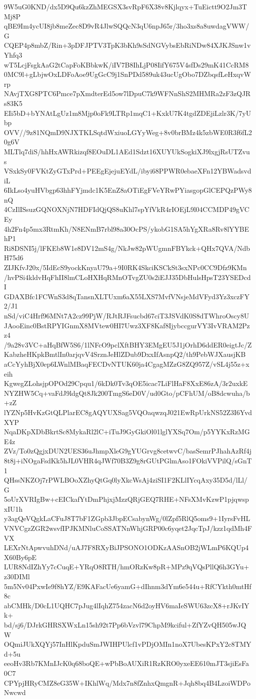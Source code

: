 9W5uG0KND/dx5D9Qu6kzZhMEGSX3svRpF6X38v8Kjlqyx+TuEictt9O2Jm3TMj8P
qBE9Im4ycUI8jb8meZec8D9vR4JlwSQQcN3qU6npJ65r/3ho3xs8a8uwdagVWW/G
CQEP4p8mbZ/Rin+3pDFJPTV3TpK3bKh9sSdNGVybsEbRiNDw84XJKJSnw1vYhfq3
wT5LcjFsgkAaG2tCapFoKBbkwK/iIV7B8IhLjP08IifY675V4sfDs29mK41CcRM8
0MC9l+gLbjwOxLDFoAoe9UgGcC9j1SnPDd589uk43ucUgObo7DZbqsfLeHxqvWrp
NAvjTXG8PTC6Pmce7pXmdterEd5ow7lDpuC7k9WFNnShS2MHMRa2zF3zQJRs83K5
EIi5bD+bYNAtLgUz1m8Mjp0oFk9LTRp1mqC1+KxkU7K4tgdZDEjiLzlr3K/7yUbp
OVV//9z81NQmD9NJXTKLSqtdWxiuoLGYyWeg+8v0brBMz4k5zbWE0R3f6fL20g6V
MLTlq7diS/hhHxAWRkizqf8EOuDL1AEd1Sdzt16XUYUkSogkiXJ9lxgjRsUTZvus
VSxkSy0FVKtZyGTxPrd+PEEgEjejuEYdL/ibyi68PPWR0ebaeXFn12YBWadsvdiL
6IkLso4yuHVbgp63hhFYjmdc1K5EnZ8aOTiEgFVeYRwPYiasgopGlCEPQzPWy8nQ
4CzIlISsuzGQNOXNjN7HDFIdQjQS8uKhl7spYfVkR4rIOEjL9l04CCMDP49gVCEy
4h2Fn4p5mx3RtmKh/N8ENmB7rbl98a30OcPS/ykobG1SA5hYgXRa8Rv8lYYBEhP1
Ri8DSNI5j/lFKEb8W1e8DV12mS4g/NkJw82pWUgmnFBYkck+QHx7QVA/NdbH75d6
ZIJKfvJ20x/5IdEcS9yockKnyaU79a+9I0RK4SkciKSCkSt3sxNPc0CC9Dfz9KMn
/hvPSi4kldvHqFhII8lmCLoHXHqRMnOTvgZU0s2iEJJ35DbHulsHpsT23YSEDcdI
GDAXBfc1FCWnS3d8qTansnXLTUxm6aX55LXS7MvfVNsjeMdVFyd3Yz3xczFY2/J1
nSd/viC4Hrf96MNt7A2cz99PjW/RJtRJFsucbd67ciT3JSVdK0S8dTWhroOscy8U
JAooEinc0BstRPYIGnmX8MVtew0HI7Uwz3XF8Kaf8IjybccgurVY3IvVRAM2Pzz4
/9a28v3VC+aHqBfW5S6/1lNFcO9pclXftBHY3EMgEU5J1jOrhD6ddER0eigtJc/Z
KabzheHKpkBmtlIn0arjqvV4SrznJeHlZDub9DxxIfAsnpQ2/th9PebWJXausjKB
aCcYyhBjX0ep6LWnlMBaqFECDvNTUK60ja4CgagMZzG8ZQ957Z/vSL4j55z+xeih
KgwegZLohsjpOPOd29Cpqu1/6kDk0Tv3qOE5icac7LiFlHaF8XxE86zA/3r2uxkE
NYZHW5Cq+vaFdJ9ldgQt8Jk200TmgS6eD0V/ud0Gto/pCFhUM/oB8dcwuha/b+zZ
lYZNp5HvKzGtQLPlarEC8gAQYUXSag5VQOaqwzqJ021EwRpUrkNS52Z3I6YvdXYP
NqaDKpXDbBkrtSc8MykaRl2lC+iTuJ9GyGkiOl01lglYXSq7Om/p5YYKxRzMGE4z
ZVz/To0zQgjxDUN2UES36uJhmpXleG9gYUGrvg8cetwvC/basSemrPJhahAzRf4j
8t8j+iNOgaFsdKk5hJL0VHR4qJWf70B3Z9g8rGUtPGlmAso1FOkiVVPilQ/sGnT1
QHssNKZOj7rPWLBOoXZhyQtGq0lyXkcWsAj4ziSI1F2KLlIYcqAxy35D5d/lLl/G
5oUrXVRIgBw+cEICkafYtDmPhjxjMzzQRjGEQ7RHE+NFsXMvKzwP1pjqwspxIU1h
y3agQeVQgkLaCFuJ8T7bF1ZGpb3JbpECsabynWg/0lZpf5RlQ5oms9+1IyrsFvHL
VNVCgzZGR2wsvfIPJKMNluCoSSATNnWhjGRP00c6yqet2JqcTpJ/kzz1qdMh4FVX
LEXrNtApwvuhDNd/uAJ7F8RXyBiJPSONO1ODKzAASnOB2jWLmP6KQUp4X60By6pE
LUR8NdIZhYy7cCuqE+YRqO8RTH/hmORzKw8pR+MPz9qVQsPllQ6h3GYu+z30DIMl
5m5Nv04PxwIe9f8hYZ/E9KAFacUe6yamG+dIhnm3dYm6e544u+RfCYkth0mtHf8c
abCMHk/D0cL1UQHC7pJug4lIqhZ754zacN6d2oyHV6maIeSWU63zcX8+rJKvIYk+
bd/sj6/DJrkGHRSXWxLn15sh92t7Pp6bVzvl79ChpM9kciful+ZfYZvQH505wJQW
OQmiJUkXQYj57InHlKpduSmJWIHPUlcf1vPDjOMIn1noX7UbesKPxY2c8TMYd+5u
eeoHv3Rb7KMnIJcK0q68boQE+wPbBoAUXiR1RzKRO0yxeEE610mJT3sjiEsFa0C7
CPYpjHRyCMZ8eG35W+IKhlWq/Mdx7n8fZnhxQmgnR+Jqh8bq4B4LzoiWDPoNwcwd
